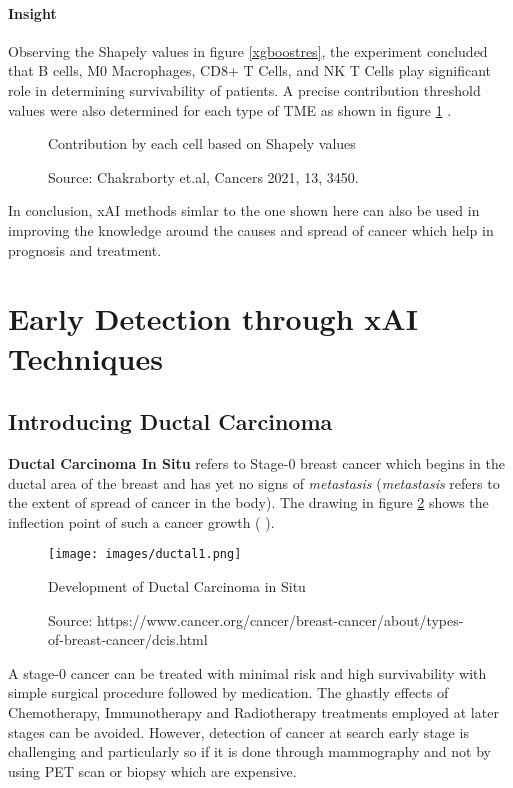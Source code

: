 \documentclass[sigconf, language=english]{acmart}
\begin{document}
\paragraph{Insight} Observing the Shapely values in figure \ref{xgboostres}, the experiment concluded that B cells, M0 Macrophages, CD8+ T Cells, and NK T Cells play significant role in determining survivability of patients. A precise contribution threshold values were also determined for each type of TME as shown in figure \ref{xgbooststat} .

\begin{figure}
  \centering
    \caption{Contribution by each cell based on Shapely values}
    \caption*{Source: Chakraborty et.al, Cancers 2021, 13, 3450.}
  \label{xgbooststat}
\end{figure}

In conclusion, xAI methods simlar to the one shown here can also be used in improving the knowledge around the causes and spread of cancer which help in prognosis and treatment.


\section{Early Detection through xAI Techniques}
\label{xaiductal}

\subsection{Introducing Ductal Carcinoma}

\textbf{Ductal Carcinoma In Situ} refers to Stage-0 breast cancer which begins in the ductal area of the breast and has yet no signs of \textit{metastasis} (\textit{metastasis} refers to the extent of spread of cancer in the body). The drawing in figure \ref{ductal} shows the inflection point of such a cancer growth ( \cite{dcis2021} ). 

\begin{figure} [!ht]
  \centering
  \texttt{[image: images/ductal1.png]}
    \caption{Development of Ductal Carcinoma in Situ}
    \caption*{Source: https://www.cancer.org/cancer/breast-cancer/about/types-of-breast-cancer/dcis.html}
  \label{ductal}
\end{figure}


A stage-0 cancer can be treated with minimal risk and high survivability with simple surgical procedure followed by medication. The ghastly effects of Chemotherapy, Immunotherapy and Radiotherapy treatments employed at later stages can be avoided. However, detection of cancer at search early stage is challenging and particularly so if it is done through mammography and not by using PET scan or biopsy which are expensive.
\end{document}
